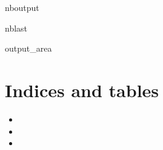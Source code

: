 \documentclass[letterpaper,10pt,english]{sphinxmanual}
\begin{document}
\begin{sphinxuseclass}{nboutput}
\begin{sphinxuseclass}{nblast}
{\begin{sphinxuseclass}{output_area}
\begin{sphinxuseclass}{}
\begin{sphinxVerbatim}[commandchars=\\\{\}]
\end{sphinxVerbatim}



\end{sphinxuseclass}
\end{sphinxuseclass}
}

\end{sphinxuseclass}
\end{sphinxuseclass}

\chapter{Indices and tables}
\label{\detokenize{index:indices-and-tables}}\begin{itemize}
\item {} 
\sphinxAtStartPar
{}

\item {} 
\sphinxAtStartPar
{}

\item {} 
\sphinxAtStartPar
{}

\end{itemize}



\renewcommand{\indexname}{Index}
\printindex
\end{document}
